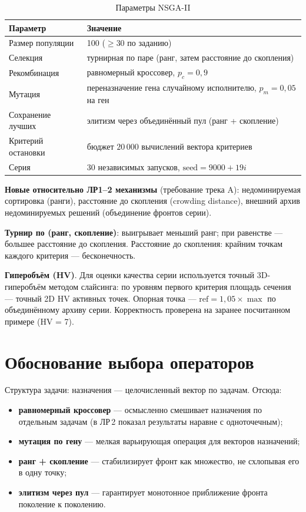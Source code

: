 \documentclass[12pt,a4paper]{article}
\begin{document}
\begin{table}[H]
\centering
\small
\caption{Параметры NSGA-II}
\label{tab:params}
\begin{tabular}{ll}
\toprule
Параметр & Значение \\
\midrule
Размер популяции & 100 ($\ge 30$ по заданию) \\
Селекция & турнирная по паре (ранг, затем расстояние до скопления) \\
Рекомбинация & равномерный кроссовер, $p_c = 0{,}9$ \\
Мутация & переназначение гена случайному исполнителю, $p_m = 0{,}05$ на ген \\
Сохранение лучших & элитизм через объединённый пул (ранг + скопление) \\
Критерий остановки & бюджет $20\,000$ вычислений вектора критериев \\
Серия & 30 независимых запусков, $\text{seed} = 9000 + 19i$ \\
\bottomrule
\end{tabular}
\end{table}

\textbf{Новые относительно ЛР1--2 механизмы} (требование трека A):
недоминируемая сортировка (ранги), расстояние до скопления
(crowding distance), внешний архив недоминируемых решений (объединение
фронтов серии).

\textbf{Турнир по (ранг, скопление)}: выигрывает меньший ранг; при
равенстве --- большее расстояние до скопления. Расстояние до скопления:
крайним точкам каждого критерия --- бесконечность.

\textbf{Гиперобъём (HV)}. Для оценки качества серии используется точный
3D-гиперобъём методом слайсинга: по уровням первого критерия площадь
сечения --- точный 2D HV активных точек. Опорная точка ---
$\mathrm{ref} = 1{,}05 \times \max$ по объединённому архиву серии.
Корректность проверена на заранее посчитанном примере (HV = 7).

\section{Обоснование выбора операторов}

Структура задачи: назначения --- целочисленный вектор по задачам. Отсюда:
\begin{itemize}
\item \textbf{равномерный кроссовер} --- осмысленно смешивает назначения
  по отдельным задачам (в ЛР\,2 показал результаты наравне с
  одноточечным);
\item \textbf{мутация по гену} --- мелкая варьирующая операция для
  векторов назначений;
\item \textbf{ранг + скопление} --- стабилизирует фронт как множество,
  не схлопывая его в одну точку;
\item \textbf{элитизм через пул} --- гарантирует монотонное приближение
  фронта поколение к поколению.
\end{itemize}
\end{document}
